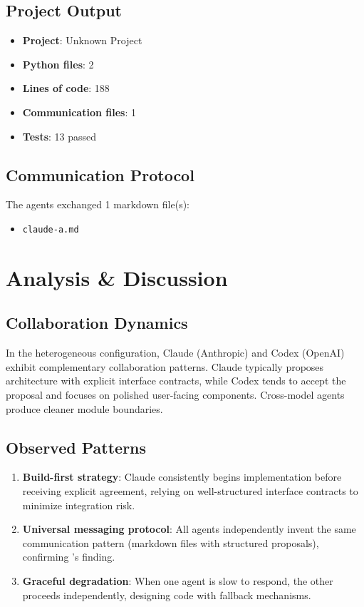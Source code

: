 \documentclass[11pt,a4paper]{article}
\begin{document}
\subsection{Project Output}

\begin{itemize}
  \item \textbf{Project}: Unknown Project
  \item \textbf{Python files}: 2
  \item \textbf{Lines of code}: 188
  \item \textbf{Communication files}: 1
  \item \textbf{Tests}: 13 passed
\end{itemize}

\subsection{Communication Protocol}

The agents exchanged 1 markdown file(s):
\begin{itemize}
  \item \texttt{claude-a.md}
\end{itemize}

\section{Analysis \& Discussion}

\subsection{Collaboration Dynamics}

In the heterogeneous configuration, Claude (Anthropic) and Codex (OpenAI) exhibit complementary collaboration patterns. Claude typically proposes architecture with explicit interface contracts, while Codex tends to accept the proposal and focuses on polished user-facing components. Cross-model agents produce cleaner module boundaries.

\subsection{Observed Patterns}

\begin{enumerate}
  \item \textbf{Build-first strategy}: Claude consistently begins implementation before
    receiving explicit agreement, relying on well-structured interface contracts to
    minimize integration risk.
  \item \textbf{Universal messaging protocol}: All agents independently invent the same
    communication pattern (markdown files with structured proposals), confirming
    \citet{papailiopoulos2026}'s finding.
  \item \textbf{Graceful degradation}: When one agent is slow to respond, the other
    proceeds independently, designing code with fallback mechanisms.
\end{enumerate}
\end{document}

